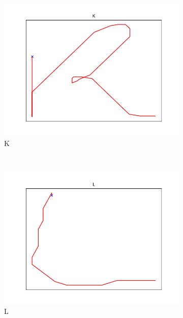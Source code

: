 \begin{figure}
\begin{subfigure}[b]{0.14\textwidth}
        \includegraphics[width=\textwidth]{images/gbem/letters_generated/K.png}
        \caption{K}
    \end{subfigure}
    ~
    \begin{subfigure}[b]{0.14\textwidth}
        \includegraphics[width=\textwidth]{images/gbem/letters_generated/L.png}
        \caption{L}
    \end{subfigure}
    ~
    \begin{subfigure}[b]{0.14\textwidth}

\end{subfigure}
\end{figure}
